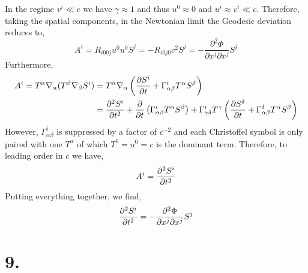 \documentclass[12pt]{article}
\begin{document}
In the regime $v^i \ll c$ we have $\gamma \approx 1$ and thus $u^0 \approx 0$ and $u^i \approx v^i \ll c$. Therefore, taking the spatial components, in the Newtonian limit the Geodesic deviation reduces to,
\[ A^i = R_{i00j} u^0 u^0 S^j = - R_{i0j0} c^2 S^j =  - \frac{\partial^2 \Phi}{\partial x^j \partial x^j} S^j \]
Furthermore,
\begin{align*}
A^i = T^\alpha \nabla_\alpha (T^\beta \nabla_\beta S^i) & = T^\alpha \nabla_\alpha \left( \frac{\partial{S^i}}{\partial{t}} + \Gamma^i_{\alpha \beta} T^\alpha S^\beta \right)
\\
& = \frac{\partial^2{S^i}}{\partial{t}^2} + \frac{\partial{}}{\partial{t}} \left( \Gamma^i_{\alpha \beta} T^\alpha S^\beta \right) + \Gamma^i_{\gamma \delta} T^\gamma \left( \frac{\partial{S^\delta}}{\partial{t}} + \Gamma^\delta_{\alpha \beta} T^\alpha S^\beta \right) 
\end{align*}
However, $\Gamma^i_{\alpha \beta}$ is suppressed by a factor of $c^{-2}$ and each Christoffel symbol is only paired with one $T^\alpha$ of which $T^0 = u^0 = c$ is the dominant term. Therefore, to leading order in $c$ we have,
\[ A^i = \frac{\partial^2{S^i}}{\partial{t}^2} \]
Putting everything together, we find,
\[ \frac{\partial^2{S^i}}{\partial{t}^2} = - \frac{\partial^2 \Phi}{\partial x^j \partial x^j} S^j \]

\section*{9. }
\end{document}
